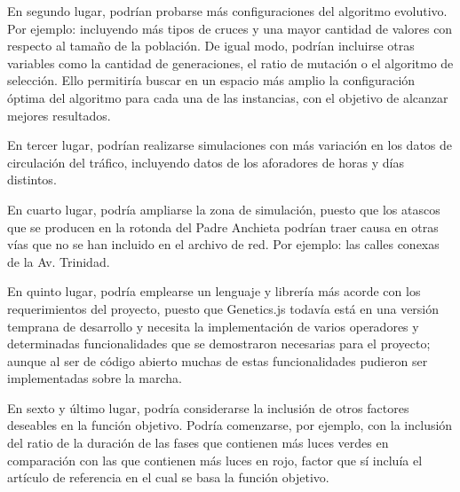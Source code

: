 En segundo lugar, podrían probarse más configuraciones del algoritmo evolutivo. Por ejemplo: incluyendo más tipos de cruces y una mayor cantidad de valores con respecto al tamaño de la población. De igual modo, podrían incluirse otras variables como la cantidad de generaciones, el ratio de mutación o el algoritmo de selección. Ello permitiría buscar en un espacio más amplio la configuración óptima del algoritmo para cada una de las instancias, con el objetivo de alcanzar mejores resultados.

En tercer lugar, podrían realizarse simulaciones con más variación en los datos de circulación del tráfico, incluyendo datos de los aforadores de horas y días distintos.

En cuarto lugar, podría ampliarse la zona de simulación, puesto que los atascos que se producen en la rotonda del Padre Anchieta podrían traer causa en otras vías que no se han incluido en el archivo de red. Por ejemplo: las calles conexas de la Av. Trinidad.

En quinto lugar, podría emplearse un lenguaje y librería más acorde con los requerimientos del proyecto, puesto que Genetics.js todavía está en una versión temprana de desarrollo y necesita la implementación de varios operadores y determinadas funcionalidades que se demostraron necesarias para el proyecto; aunque al ser de código abierto muchas de estas funcionalidades pudieron ser implementadas sobre la marcha.

En sexto y último lugar, podría considerarse la inclusión de otros factores deseables en la función objetivo. Podría comenzarse, por ejemplo, con la inclusión del ratio de la duración de las fases que contienen más luces verdes en comparación con las que contienen más luces en rojo, factor que sí incluía el artículo de referencia en el cual se basa la función objetivo.
